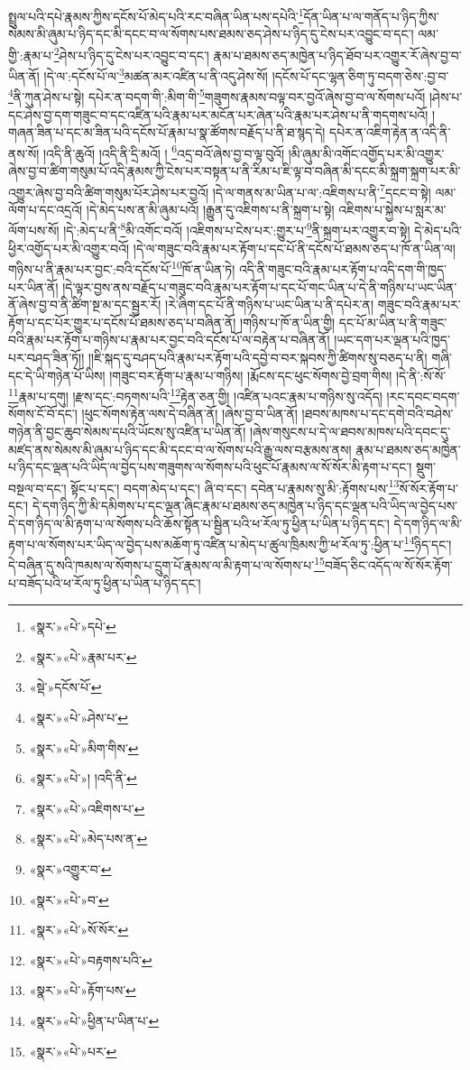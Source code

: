 སྤྲུལ་པའི་དཔེ་རྣམས་ཀྱིས་དངོས་པོ་མེད་པའི་རང་བཞིན་ཡིན་པས་དཔེའི་\footnote{«སྣར་»«པེ་»དཔེ་}དོན་ཡིན་པ་ལ་གནོད་པ་ཉིད་ཀྱིས་སེམས་མི་ཞུམ་པ་ཉིད་དང་མི་དངང་བ་ལ་སོགས་པས་ཐམས་ཅད་ཤེས་པ་ཉིད་དུ་ངེས་པར་འབྱུང་བ་དང་། ལམ་གྱི་:རྣམ་པ་\footnote{«སྣར་»«པེ་»རྣམ་པར་}ཤེས་པ་ཉིད་དུ་ངེས་པར་འབྱུང་བ་དང་། རྣམ་པ་ཐམས་ཅད་མཁྱེན་པ་ཉིད་ཐོབ་པར་འགྱུར་རོ་ཞེས་བྱ་བ་ཡིན་ནོ། །དེ་ལ་:དངོས་པོ་ལ་\footnote{«སྡེ་»དངོས་པོ་}མཚན་མར་འཛིན་པ་ནི་འདུ་ཤེས་སོ། །དངོས་པོ་དང་ལྷན་ཅིག་ཏུ་བདག་ཅེས་:བྱ་བ་\footnote{«སྣར་»«པེ་»ཤེས་པ་}ནི་ཀུན་ཤེས་པ་སྟེ། དཔེར་ན་བདག་གི་:མིག་གི་\footnote{«སྣར་»«པེ་»མིག་གིས་}གཟུགས་རྣམས་བལྟ་བར་བྱའོ་ཞེས་བྱ་བ་ལ་སོགས་པའོ། །ཤེས་པ་དང་ཤེས་བྱ་དག་གཟུང་བ་དང་འཛིན་པའི་རྣམ་པར་མངོན་པར་ཞེན་པའི་རྣམ་པར་ཤེས་པ་ནི་གདགས་པའོ། །གཞན་ཟིན་པ་དང་མ་ཟིན་པའི་དངོས་པོ་རྣམ་པ་སྣ་ཚོགས་བརྗོད་པ་ནི་ཐ་སྙད་དེ། དཔེར་ན་འཇིག་རྟེན་ན་འདི་ནི་ནས་སོ། །འདི་ནི་ཆུའོ། །འདི་ནི་དྲི་མའོ། །
\footnote{«སྣར་»«པེ་»། །འདི་ནི་}འདྲ་བའོ་ཞེས་བྱ་བ་ལྟ་བུའོ། །མི་ཞུམ་མི་འགོང་འགྱོད་པར་མི་འགྱུར་ཞེས་བྱ་བ་ཚིག་གསུམ་པོ་འདི་རྣམས་ཀྱི་ངེས་པར་བསྟན་པ་ནི་རིམ་པ་ཇི་ལྟ་བ་བཞིན་མི་དངང་མི་སྐྲག་སྐྲག་པར་མི་འགྱུར་ཞེས་བྱ་བའི་ཚིག་གསུམ་པོར་ཤེས་པར་བྱའོ། །དེ་ལ་གནས་མ་ཡིན་པ་ལ་:འཇིགས་པ་ནི་\footnote{«སྣར་»«པེ་»འཇིགས་པ་}དངང་བ་སྟེ། ལམ་ལོག་པ་དང་འདྲའོ། །དེ་མེད་པས་ན་མི་ཞུམ་པའོ། །རྒྱུན་དུ་འཇིགས་པ་ནི་སྐྲག་པ་སྟེ། འཇིགས་པ་སྐྱེས་པ་སླར་མ་ལོག་པས་སོ། །དེ་:མེད་པ་ནི་\footnote{«སྣར་»«པེ་»མེད་པས་ན་}མི་འགོང་བའོ། །འཇིགས་པ་ངེས་པར་:གྱུར་པ་\footnote{«སྣར་»འགྱུར་བ་}ནི་སྐྲག་པར་འགྱུར་བ་སྟེ། དེ་མེད་པའི་ཕྱིར་འགྱོད་པར་མི་འགྱུར་བའོ། །དེ་ལ་གཟུང་བའི་རྣམ་པར་རྟོག་པ་དང་པོ་ནི་དངོས་པོ་ཐམས་ཅད་པ་ཁོ་ན་ཡིན་ལ། གཉིས་པ་ནི་རྣམ་པར་བྱང་:བའི་དངོས་པོ་\footnote{«སྣར་»«པེ་»བ་}ཁོ་ན་ཡིན་ཏེ། འདི་ནི་གཟུང་བའི་རྣམ་པར་རྟོག་པ་འདི་དག་གི་ཁྱད་པར་ཡིན་ནོ། །དེ་ལྟར་བྱས་ནས་བརྗོད་པ་གཟུང་བའི་རྣམ་པར་རྟོག་པ་དང་པོ་གང་ཡིན་པ་དེ་ནི་གཉིས་པ་ཡང་ཡིན་ནོ་ཞེས་བྱ་བ་ནི་ཚིག་སྔ་མ་དང་སྦྱར་རོ། །རེ་ཞིག་དང་པོ་ནི་གཉིས་པ་ཡང་ཡིན་པ་ནི་དཔེར་ན། གཟུང་བའི་རྣམ་པར་རྟོག་པ་དང་པོར་གྱུར་པ་དངོས་པོ་ཐམས་ཅད་པ་བཞིན་ནོ། །གཉིས་པ་ཁོ་ན་ཡིན་གྱི། དང་པོ་མ་ཡིན་པ་ནི་གཟུང་བའི་རྣམ་པར་རྟོག་པ་གཉིས་པ་རྣམ་པར་བྱང་བའི་དངོས་པོ་ལ་བརྟེན་པ་བཞིན་ནོ། །ཡང་དག་པར་ལྡན་པའི་ཁྱད་པར་བཤད་ཟིན་ཏོ།། །།ཇི་སྐད་དུ་བཤད་པའི་རྣམ་པར་རྟོག་པའི་དབྱེ་བ་བར་སྐབས་ཀྱི་ཚིགས་སུ་བཅད་པ་ནི། གཞི་དང་དེ་ཡི་གཉེན་པོ་ཡིས། །གཟུང་བར་རྟོག་པ་རྣམ་པ་གཉིས། །རྨོངས་དང་ཕུང་སོགས་བྱེ་བྲག་གིས། །དེ་ནི་:སོ་སོ་\footnote{«སྣར་»«པེ་»སོ་སོར་}རྣམ་པ་དགུ། །རྫས་དང་:བཏགས་པའི་\footnote{«སྣར་»«པེ་»བརྟགས་པའི་}རྟེན་ཅན་གྱི། །འཛིན་པའང་རྣམ་པ་གཉིས་སུ་འདོད། །རང་དབང་བདག་སོགས་ངོ་བོ་དང་། །ཕུང་སོགས་རྟེན་ལས་དེ་བཞིན་ནོ། །ཞེས་བྱ་བ་ཡིན་ནོ། །ཐབས་མཁས་པ་དང་དགེ་བའི་བཤེས་གཉེན་ནི་བྱང་ཆུབ་སེམས་དཔའི་ཡོངས་སུ་འཛིན་པ་ཡིན་ནོ། །ཞེས་གསུངས་པ་དེ་ལ་ཐབས་མཁས་པའི་དབང་དུ་མཛད་ནས་སེམས་མི་ཞུམ་པ་ཉིད་དང་མི་དངང་བ་ལ་སོགས་པའི་རྒྱུ་ལས་བརྩམས་ནས། རྣམ་པ་ཐམས་ཅད་མཁྱེན་པ་ཉིད་དང་ལྡན་པའི་ཡིད་ལ་བྱེད་པས་གཟུགས་ལ་སོགས་པའི་ཕུང་པོ་རྣམས་ལ་སོ་སོར་མི་རྟག་པ་དང་། སྡུག་བསྔལ་བ་དང་། སྟོང་པ་དང་། བདག་མེད་པ་དང་། ཞི་བ་དང་། དབེན་པ་རྣམས་སུ་མི་:རྟོགས་པས་\footnote{«སྣར་»«པེ་»རྟོག་པས་}སོ་སོར་རྟོག་པ་དང་། དེ་དག་ཉིད་ཀྱི་མི་དམིགས་པ་དང་ལྡན་ཞིང་རྣམ་པ་ཐམས་ཅད་མཁྱེན་པ་ཉིད་དང་ལྡན་པའི་ཡིད་ལ་བྱེད་པས་དེ་དག་ཉིད་ལ་མི་རྟག་པ་ལ་སོགས་པའི་ཆོས་སྟོན་པ་སྦྱིན་པའི་ཕ་རོལ་ཏུ་ཕྱིན་པ་ཡིན་པ་ཉིད་དང་། དེ་དག་ཉིད་ལ་མི་རྟག་པ་ལ་སོགས་པར་ཡིད་ལ་བྱེད་པས་མཆོག་ཏུ་འཛིན་པ་མེད་པ་ཚུལ་ཁྲིམས་ཀྱི་ཕ་རོལ་ཏུ་:ཕྱིན་པ་\footnote{«སྣར་»«པེ་»ཕྱིན་པ་ཡིན་པ་}ཉིད་དང་། དེ་བཞིན་དུ་སའི་ཁམས་ལ་སོགས་པ་དྲུག་པོ་རྣམས་ལ་མི་རྟག་པ་ལ་སོགས་པ་\footnote{«སྣར་»«པེ་»པར་}བཟོད་ཅིང་འདོད་ལ་སོ་སོར་རྟོག་པ་བཟོད་པའི་ཕ་རོལ་ཏུ་ཕྱིན་པ་ཡིན་པ་ཉིད་དང་། 